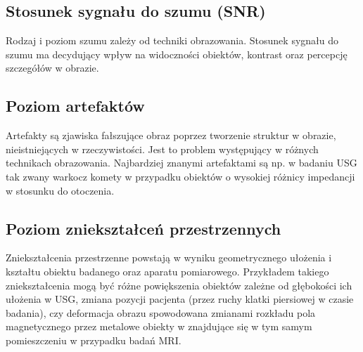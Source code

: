\subsection{Stosunek sygnału do szumu (SNR)}

Rodzaj i poziom szumu zależy od techniki obrazowania.
Stosunek sygnału do szumu ma decydujący wpływ na widoczności obiektów, kontrast oraz percepcję szczegółów w obrazie.

\subsection{Poziom artefaktów}

Artefakty są zjawiska fałszujące obraz poprzez tworzenie struktur w obrazie, nieistniejących w rzeczywistości.
Jest to problem występujący w różnych technikach obrazowania.
Najbardziej znanymi artefaktami są np. w badaniu USG tak zwany warkocz komety w przypadku obiektów o wysokiej różnicy impedancji w stosunku do otoczenia.

\subsection{Poziom zniekształceń przestrzennych}

Zniekształcenia przestrzenne powstają w wyniku geometrycznego ułożenia i kształtu obiektu badanego oraz aparatu pomiarowego.
Przykładem takiego zniekształcenia mogą być różne powiększenia obiektów zależne od głębokości ich ułożenia w USG, zmiana pozycji pacjenta (przez ruchy klatki piersiowej w czasie badania), czy deformacja obrazu spowodowana zmianami rozkładu pola magnetycznego przez metalowe obiekty w znajdujące się w tym samym pomieszczeniu w przypadku badań MRI.

